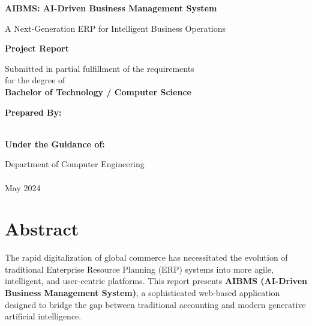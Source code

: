 \documentclass[12pt,a4paper]{report}
\begin{document}
\begin{titlepage}
    \begin{center}
        \vspace*{1cm}
        
        \Huge
        \textbf{AIBMS: AI-Driven Business Management System}
        
        \vspace{0.5cm}
        \LARGE
        A Next-Generation ERP for Intelligent Business Operations
        
        \vspace{1.5cm}
        
        \textbf{Project Report}
        
        \vspace{0.8cm}
        
        \large
        Submitted in partial fulfillment of the requirements \\
        for the degree of \\
        \textbf{Bachelor of Technology / Computer Science}
        
        \vspace{1.5cm}
        
        \textbf{Prepared By:} \\
        [Your Name] \\
        [Your Roll Number]
        
        \vfill
        
        \textbf{Under the Guidance of:} \\
        [Internal Guide Name]
        
        \vspace{0.8cm}
        
        
        \vspace{0.8cm}
        
        \Large
        Department of Computer Engineering \\
        [Your College Name] \\
        May 2024
        
    \end{center}
\end{titlepage}

\chapter*{Abstract}
The rapid digitalization of global commerce has necessitated the evolution of traditional Enterprise Resource Planning (ERP) systems into more agile, intelligent, and user-centric platforms. This report presents \textbf{AIBMS (AI-Driven Business Management System)}, a sophisticated web-based application designed to bridge the gap between traditional accounting and modern generative artificial intelligence. 
\end{document}

